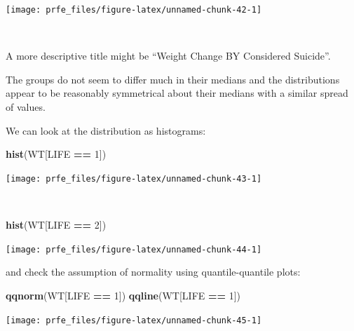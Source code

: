 \documentclass[12pt,a4paper]{book}
\newenvironment{Shaded}{\begin{snugshade}}{\end{snugshade}}
\newcommand{\DecValTok}[1]{\textcolor[rgb]{0.00,0.00,0.81}{#1}}
\newcommand{\KeywordTok}[1]{\textcolor[rgb]{0.13,0.29,0.53}{\textbf{#1}}}
\newcommand{\NormalTok}[1]{#1}
\newcommand{\OperatorTok}[1]{\textcolor[rgb]{0.81,0.36,0.00}{\textbf{#1}}}
\newcommand{\StringTok}[1]{\textcolor[rgb]{0.31,0.60,0.02}{#1}}
\theoremstyle{definition}
\theoremstyle{definition}
\theoremstyle{definition}
\theoremstyle{remark}
\begin{document}
\begin{center}\texttt{[image: prfe\_files/figure-latex/unnamed-chunk-42-1]} \end{center}

~

A more descriptive title might be ``Weight Change BY Considered
Suicide''.

The groups do not seem to differ much in their medians and the
distributions appear to be reasonably symmetrical about their medians
with a similar spread of values.

\newpage

We can look at the distribution as histograms:

\begin{Shaded}
\begin{Highlighting}[]
\KeywordTok{hist}\NormalTok{(WT[LIFE }\OperatorTok{==}\StringTok{ }\DecValTok{1}\NormalTok{])}
\end{Highlighting}
\end{Shaded}

\begin{center}\texttt{[image: prfe\_files/figure-latex/unnamed-chunk-43-1]} \end{center}

~

\begin{Shaded}
\begin{Highlighting}[]
\KeywordTok{hist}\NormalTok{(WT[LIFE }\OperatorTok{==}\StringTok{ }\DecValTok{2}\NormalTok{])}
\end{Highlighting}
\end{Shaded}

\begin{center}\texttt{[image: prfe\_files/figure-latex/unnamed-chunk-44-1]} \end{center}

\newpage

and check the assumption of normality using quantile-quantile plots:

\begin{Shaded}
\begin{Highlighting}[]
\KeywordTok{qqnorm}\NormalTok{(WT[LIFE }\OperatorTok{==}\StringTok{ }\DecValTok{1}\NormalTok{])}
\KeywordTok{qqline}\NormalTok{(WT[LIFE }\OperatorTok{==}\StringTok{ }\DecValTok{1}\NormalTok{])}
\end{Highlighting}
\end{Shaded}

\begin{center}\texttt{[image: prfe\_files/figure-latex/unnamed-chunk-45-1]} \end{center}
\end{document}
